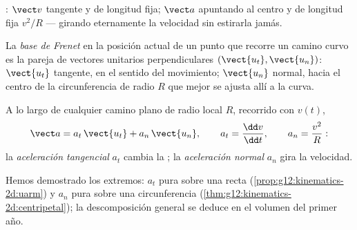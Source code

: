 \begin{omfigure}

{\small {}: $\vect v$ tangente y de longitud
fija; $\vect a$ apuntando al centro y de longitud fija $v^2/R$ ---
girando eternamente la velocidad sin estirarla jamás.}
\end{omfigure}

\begin{definition}\label{def:g12:kinematics-2d:frenet}
La \emph{base de Frenet} en la posición actual de
un punto que recorre un camino curvo es la pareja de vectores unitarios
perpendiculares $(\vect{u_t}, \vect{u_n})$: $\vect{u_t}$ tangente, en el
sentido del movimiento; $\vect{u_n}$ normal, hacia el centro de la
circunferencia de radio $R$ que mejor se ajusta allí a la curva.
\end{definition}

\begin{proposition}\label{prop:g12:kinematics-2d:frenetacc}
A lo largo de cualquier camino plano de radio local $R$, recorrido con
 $v(t)$,
\[
\vect a = a_t\,\vect{u_t} + a_n\,\vect{u_n},
\qquad a_t = \frac{\dd v}{\dd t},
\qquad a_n = \frac{v^2}{R}:
\]
la \emph{aceleración tangencial} $a_t$
cambia la ; la \emph{aceleración normal} $a_n$ gira la velocidad.
\end{proposition}
\admitted

\begin{remark}\label{rem:g12:kinematics-2d:frenetproof}
Hemos demostrado los extremos: $a_t$ pura sobre una recta
(\cref{prop:g12:kinematics-2d:uarm}) y $a_n$ pura sobre una
circunferencia (\cref{thm:g12:kinematics-2d:centripetal}); la
descomposición general se deduce en el volumen del primer año.
\end{remark}

